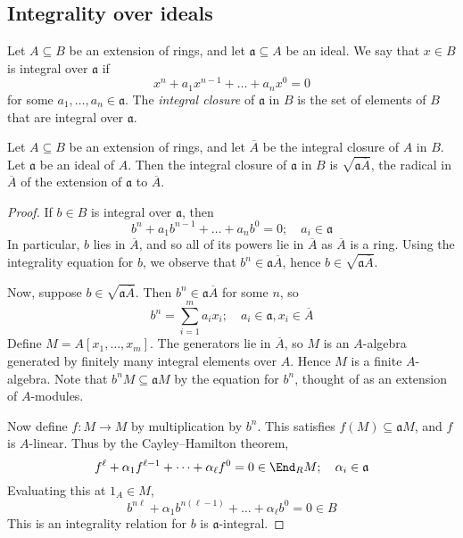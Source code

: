 \subsection{Integrality over ideals}
\begin{definition}
    Let \( A \subseteq B \) be an extension of rings, and let \( \mathfrak a \subseteq A \) be an ideal.
    We say that \( x \in B \) is integral over \( \mathfrak a \) if
    \[ x^n + a_1 x^{n-1} + \dots + a_n x^0 = 0 \]
    for some \( a_1, \dots, a_n \in \mathfrak a \).
    The \emph{integral closure} of \( \mathfrak a \) in \( B \) is the set of elements of \( B \) that are integral over \( \mathfrak a \).
\end{definition}
\begin{proposition}
    Let \( A \subseteq B \) be an extension of rings, and let \( \overline A \) be the integral closure of \( A \) in \( B \).
    Let \( \mathfrak a \) be an ideal of \( A \).
    Then the integral closure of \( \mathfrak a \) in \( B \) is \( \sqrt{\mathfrak a \overline A} \), the radical in \( \overline A \) of the extension of \( \mathfrak a \) to \( \overline A \).
\end{proposition}
\begin{proof}
    If \( b \in B \) is integral over \( \mathfrak a \), then
    \[ b^n + a_1 b^{n-1} + \dots + a_n b^0 = 0;\quad a_i \in \mathfrak a \]
    In particular, \( b \) lies in \( \overline A \), and so all of its powers lie in \( \overline A \) as \( \overline A \) is a ring.
    Using the integrality equation for \( b \), we observe that \( b^n \in \mathfrak a \overline A \), hence \( b \in \sqrt{\mathfrak a \overline A} \).

    Now, suppose \( b \in \sqrt{\mathfrak a \overline A} \).
    Then \( b^n \in \mathfrak a \overline A \) for some \( n \), so
    \[ b^n = \sum_{i=1}^m a_i x_i;\quad a_i \in \mathfrak a, x_i \in \overline A \]
    Define \( M = A[x_1, \dots, x_m] \).
    The generators lie in \( \overline A \), so \( M \) is an \( A \)-algebra generated by finitely many integral elements over \( A \).
    Hence \( M \) is a finite \( A \)-algebra.
    Note that \( b^n M \subseteq \mathfrak a M \) by the equation for \( b^n \), thought of as an extension of \( A \)-modules.

    Now define \( f : M \to M \) by multiplication by \( b^n \).
    This satisfies \( f(M) \subseteq \mathfrak a M \), and \( f \) is \( A \)-linear.
    Thus by the Cayley--Hamilton theorem,
    \[ f^\ell + \alpha_1 f^{\ell - 1} + \dots + \alpha_\ell f^0 = 0 \in \End_R M;\quad \alpha_i \in \mathfrak a \]
    Evaluating this at \( 1_A \in M \),
    \[ b^{n\ell} + \alpha_1 b^{n(\ell - 1)} + \dots + \alpha_\ell b^0 = 0 \in B \]
    This is an integrality relation for \( b \) is \( \mathfrak a \)-integral.
\end{proof}
